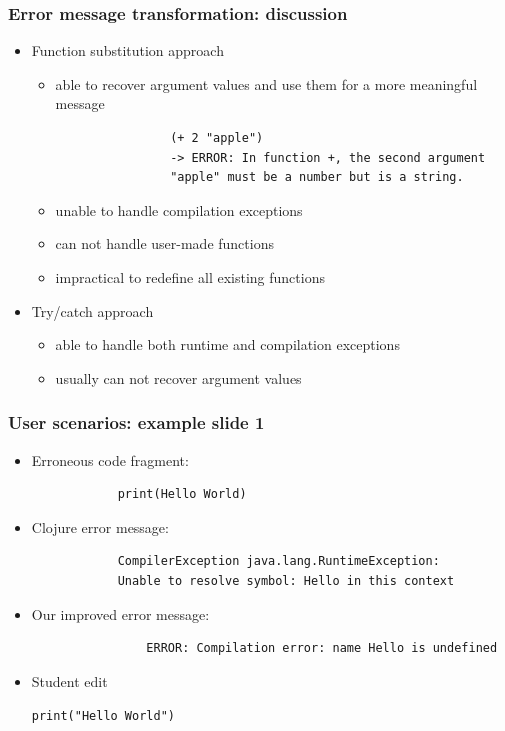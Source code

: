\documentclass{beamer}
\begin{document}
\begin{frame}[fragile]
\frametitle{Error message transformation: discussion}

	\begin{itemize}
		\item Function substitution approach
			\begin{itemize}
				\item able to recover argument values and use them for a more meaningful message
				\begin{verbatim}
				(+ 2 "apple")
				-> ERROR: In function +, the second argument
				"apple" must be a number but is a string.
				\end{verbatim}
				\item unable to handle compilation exceptions
				\item can not handle user-made functions
				\item impractical to redefine all existing functions
			\end{itemize}
		\item Try/catch approach
			\begin{itemize}
	 			\item able to handle both runtime and compilation exceptions
				\item usually can not recover argument values
	 		\end{itemize} 
	\end{itemize}
\end{frame}

\begin{frame}[fragile]
\frametitle{User scenarios: example slide 1}

	\begin{itemize}
		\item Erroneous code fragment:
			\begin{verbatim}
			print(Hello World)
			\end{verbatim}
			
		\item Clojure error message:
			\begin{verbatim}
			CompilerException java.lang.RuntimeException:
			Unable to resolve symbol: Hello in this context
			\end{verbatim}
			
		\item Our improved error message:
			\begin{verbatim}
				ERROR: Compilation error: name Hello is undefined
			\end{verbatim}
			
		\item Student edit
		
				\texttt{print(\alert{"Hello World"})}
	\end{itemize}
	
\end{frame}
\end{document}
